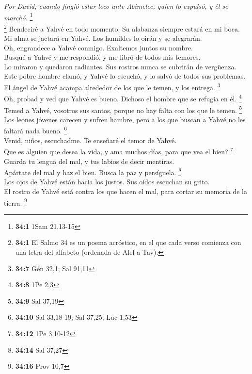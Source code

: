 \emph{Por David; cuando fingió estar loco ante Abimelec, quien lo
expulsó, y él se marchó.} \footnote{\textbf{34:1} 1Sam 21,13-15}\\
 \footnote{\textbf{34:1} El Salmo 34 es un poema
  acróstico, en el que cada verso comienza con una letra del alfabeto
  (ordenada de Alef a Tav).} Bendeciré a Yahvé en todo momento. Su
alabanza siempre estará en mi boca.\\
 Mi alma se jactará en Yahvé. Los humildes lo oirán y se
alegrarán.\\
 Oh, engrandece a Yahvé conmigo. Exaltemos juntos su
nombre.\\
 Busqué a Yahvé y me respondió, y me libró de todos mis
temores.\\
 Lo miraron y quedaron radiantes. Sus rostros nunca se
cubrirán de vergüenza.\\
 Este pobre hombre clamó, y Yahvé lo escuchó, y lo salvó
de todos sus problemas.\\
 El ángel de Yahvé acampa alrededor de los que le temen, y
los entrega. \footnote{\textbf{34:7} Gén 32,1; Sal 91,11}\\
 Oh, probad y ved que Yahvé es bueno. Dichoso el hombre
que se refugia en él. \footnote{\textbf{34:8} 1Pe 2,3}\\
 Temed a Yahvé, vosotros sus santos, porque no hay falta
con los que le temen. \footnote{\textbf{34:9} Sal 37,19}\\
 Los leones jóvenes carecen y sufren hambre, pero a los
que buscan a Yahvé no les faltará nada bueno. \footnote{\textbf{34:10}
  Sal 33,18-19; Sal 37,25; Luc 1,53}\\
 Venid, niños, escuchadme. Te enseñaré el temor de
Yahvé.\\
 Que es alguien que desea la vida, y ama muchos días,
para que vea el bien? \footnote{\textbf{34:12} 1Pe 3,10-12}\\
 Guarda tu lengua del mal, y tus labios de decir
mentiras.\\
 Apártate del mal y haz el bien. Busca la paz y
persíguela. \footnote{\textbf{34:14} Sal 37,27}\\
 Los ojos de Yahvé están hacia los justos. Sus oídos
escuchan su grito.\\
 El rostro de Yahvé está contra los que hacen el mal,
para cortar su memoria de la tierra. \footnote{\textbf{34:16} Prov 10,7}\\
